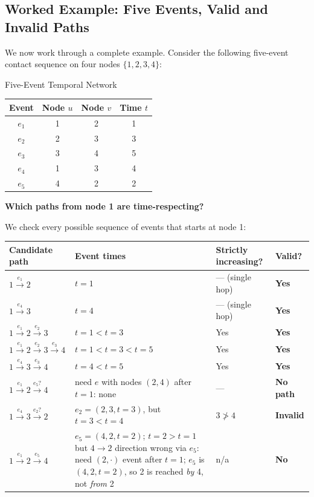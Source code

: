 \subsection{Worked Example: Five Events, Valid and Invalid Paths}

We now work through a complete example. Consider the following five-event contact sequence on
four nodes $\{1, 2, 3, 4\}$:

\begin{examplebox}{Five-Event Temporal Network}
\begin{center}
\begin{tabular}{cccc}
\toprule
\textbf{Event} & \textbf{Node $u$} & \textbf{Node $v$} & \textbf{Time $t$} \\
\midrule
$e_1$ & 1 & 2 & 1 \\
$e_2$ & 2 & 3 & 3 \\
$e_3$ & 3 & 4 & 5 \\
$e_4$ & 1 & 3 & 4 \\
$e_5$ & 4 & 2 & 2 \\
\bottomrule
\end{tabular}
\end{center}

\medskip
\noindent\textbf{Which paths from node 1 are time-respecting?}

We check every possible sequence of events that starts at node 1:

\begin{center}
\begin{tabular}{llll}
\toprule
\textbf{Candidate path} & \textbf{Event times} & \textbf{Strictly increasing?} & \textbf{Valid?} \\
\midrule
$1 \xrightarrow{e_1} 2$               & $t=1$             & --- (single hop)  & \textcolor{green!60!black}{\textbf{Yes}} \\
$1 \xrightarrow{e_4} 3$               & $t=4$             & --- (single hop)  & \textcolor{green!60!black}{\textbf{Yes}} \\
$1 \xrightarrow{e_1} 2 \xrightarrow{e_2} 3$  & $t=1 < t=3$  & Yes  & \textcolor{green!60!black}{\textbf{Yes}} \\
$1 \xrightarrow{e_1} 2 \xrightarrow{e_2} 3 \xrightarrow{e_3} 4$ & $t=1<t=3<t=5$ & Yes & \textcolor{green!60!black}{\textbf{Yes}} \\
$1 \xrightarrow{e_4} 3 \xrightarrow{e_3} 4$ & $t=4 < t=5$ & Yes & \textcolor{green!60!black}{\textbf{Yes}} \\
$1 \xrightarrow{e_1} 2 \xrightarrow{e_5?} 4$ & need $e$ with nodes $(2,4)$ after $t=1$: none & --- & \textcolor{red!70!black}{\textbf{No path}} \\
$1 \xrightarrow{e_4} 3 \xrightarrow{e_2?} 2$ & $e_2=(2,3,t=3)$, but $t=3 < t=4$ & $3 \not> 4$ & \textcolor{red!70!black}{\textbf{Invalid}} \\
$1 \xrightarrow{e_1} 2 \xrightarrow{e_5} 4$ & $e_5=(4,2,t=2)$; $t=2>t=1$ but $4\to 2$ direction wrong via $e_5$: need $(2,\cdot)$ event after $t=1$; $e_5$ is $(4,2,t=2)$, so 2 is reached \textit{by} 4, not \textit{from} 2 & n/a & \textcolor{red!70!black}{\textbf{No}} \\
\bottomrule
\end{tabular}
\end{center}


\end{examplebox}
